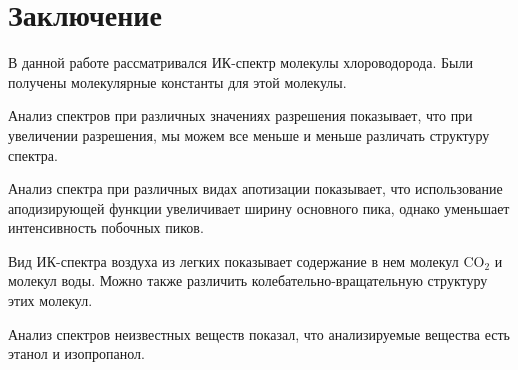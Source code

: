 \clearpage
\section{Заключение}
В данной работе рассматривался ИК-спектр молекулы хлороводорода. Были получены молекулярные константы для этой молекулы.


Анализ спектров при различных значениях разрешения показывает, что при увеличении разрешения, мы можем все меньше и меньше различать структуру спектра.

Анализ спектра при различных видах апотизации показывает, что использование аподизирующей функции увеличивает ширину основного пика, однако уменьшает интенсивность побочных пиков.

Вид ИК-спектра воздуха из легких показывает содержание в нем молекул CO$_2$ и молекул воды. Можно также различить колебательно-вращательную структуру этих молекул.

Анализ спектров неизвестных веществ показал, что анализируемые вещества есть этанол и изопропанол. 